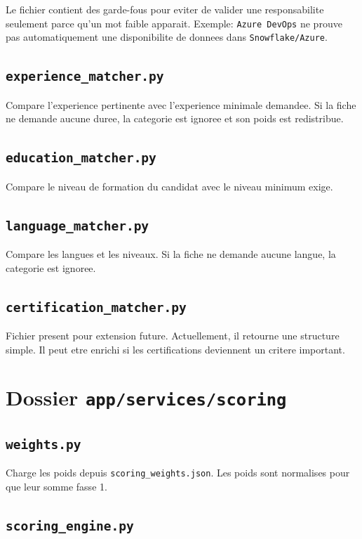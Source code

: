 \documentclass[12pt,a4paper]{article}
\begin{document}
Le fichier contient des garde-fous pour eviter de valider une responsabilite seulement parce qu'un mot faible apparait. Exemple: \texttt{Azure DevOps} ne prouve pas automatiquement une disponibilite de donnees dans \texttt{Snowflake/Azure}.

\subsection{\texttt{experience\_matcher.py}}

Compare l'experience pertinente avec l'experience minimale demandee. Si la fiche ne demande aucune duree, la categorie est ignoree et son poids est redistribue.

\subsection{\texttt{education\_matcher.py}}

Compare le niveau de formation du candidat avec le niveau minimum exige.

\subsection{\texttt{language\_matcher.py}}

Compare les langues et les niveaux. Si la fiche ne demande aucune langue, la categorie est ignoree.

\subsection{\texttt{certification\_matcher.py}}

Fichier present pour extension future. Actuellement, il retourne une structure simple. Il peut etre enrichi si les certifications deviennent un critere important.

\section{Dossier \texttt{app/services/scoring}}

\subsection{\texttt{weights.py}}

Charge les poids depuis \texttt{scoring\_weights.json}. Les poids sont normalises pour que leur somme fasse 1.

\subsection{\texttt{scoring\_engine.py}}
\end{document}
